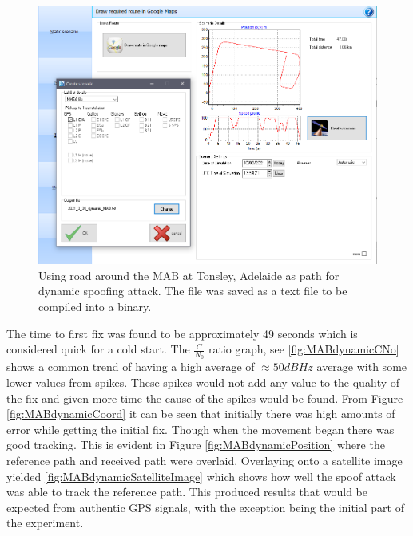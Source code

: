 \begin{figure}[!h]
    \begin{centering}
        \includegraphics[width=14cm,keepaspectratio]{Figures/2021_3_30_dynamic_MAB_setup.png}
        \caption{Using road around the MAB at Tonsley, Adelaide as path for dynamic spoofing attack. The file was saved as a text file to be compiled into a binary.}
        \label{fig:MABdynamicSetup}
    \end{centering}
\end{figure}

The time to first fix was found to be approximately 49 seconds which is considered quick for a cold start. The $\frac{C}{N_0}$ ratio graph, see \ref{fig:MABdynamicCNo} shows a common trend of having
a high average of $\approx 50dBHz$ average with some lower values from spikes. These spikes would not add any value to the quality of the fix and given more time the
cause of the spikes would be found. From Figure \ref{fig:MABdynamicCoord} it can be seen that initially there was high amounts of error while getting the initial fix.
Though when the movement began there was good tracking. This is evident in Figure \ref{fig:MABdynamicPosition} where the reference path and received path were overlaid.
Overlaying onto a satellite image yielded \ref{fig:MABdynamicSatelliteImage} which shows how well the spoof attack was able to track the reference path. This produced
results that would be expected from authentic GPS signals, with the exception being the initial part of the experiment. 

